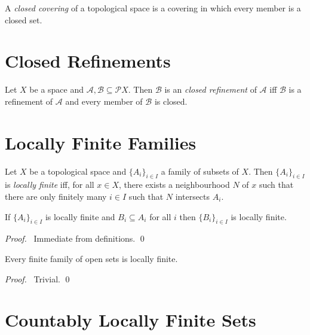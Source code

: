 \begin{df}
  A \emph{closed covering} of a topological space is a covering in which
  every member is a closed set.
\end{df}

\section{Closed Refinements}

\begin{df}
  Let $X$ be a space and $\mathcal{A}, \mathcal{B} \subseteq \mathcal{P} X$. Then $\mathcal{B}$ is an \emph{closed refinement} of $\mathcal{A}$ iff $\mathcal{B}$ is a refinement of $\mathcal{A}$ and every member of $\mathcal{B}$ is closed.
\end{df}

\section{Locally Finite Families}

\begin{df}
  Let $X$ be a topological space and $\{ A_i \}_{i \in I}$ a family of
  subsets of $X$. Then $\{ A_i \}_{i \in I}$ is \emph{locally finite} iff,
  for all $x \in X$, there exists a neighbourhood $N$ of $x$ such that there
  are only finitely many $i \in I$ such that $N$ intersects $A_i$.
\end{df}

\begin{prop}
  \label{prop:topology:locally_finite:subset}
  If $\{ A_i \}_{i \in I}$ is locally finite and $B_i \subseteq A_i$ for all
  $i$ then $\{ B_i \}_{i \in I}$ is locally finite.
\end{prop}

\begin{proof}
  \pf\ Immediate from definitions. \qed
\end{proof}

\begin{prop}
  Every finite family of open sets is locally finite.
\end{prop}

\begin{proof}
  \pf\ Trivial. \qed
\end{proof}

\section{Countably Locally Finite Sets}

